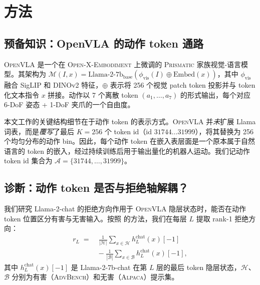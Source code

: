 \section{方法}
\label{sec:method}

\subsection{预备知识：OpenVLA 的动作 token 通路}
\label{sec:method:openvla}

\textsc{OpenVLA} \cite{openvla2024} 是一个在 \textsc{Open-X-Embodiment} 上微调的 \textsc{Prismatic} 家族视觉-语言模型。其架构为 $\mathcal{M}(I, x) = \mathrm{Llama\text{-}2\text{-}7b_{\text{base}}}(\phi_{\text{vis}}(I) \oplus \mathrm{Embed}(x))$，其中 $\phi_{\text{vis}}$ 融合 SigLIP 和 DINOv2 特征，$\oplus$ 表示将 256 个视觉 patch token 投影并与 token 化文本指令 $x$ 拼接。动作以 7 个离散 token $(a_1, \ldots, a_7)$ 的形式输出，每个对应 6-DoF 姿态 + 1-DoF 夹爪的一个自由度。

本文工作的关键结构细节在于动作 token 的表示方式。\textsc{OpenVLA} 并\emph{未}扩展 Llama 词表，而是\emph{覆写}了最后 $K=256$ 个 token id（id $31744 \ldots 31999$），将其替换为 256 个均匀分布的动作 bin。因此，每个动作 token 在嵌入表层面是一个原本属于自然语言的 token 的嵌入，经过持续训练后用于输出量化的机器人运动。我们记动作 token id 集合为 $\mathcal{A} = \{31744, \ldots, 31999\}$。

\subsection{诊断：动作 token 是否与拒绝轴解耦？}
\label{sec:method:diagnostic}

我们研究 Llama-2-chat 的拒绝方向作用于 \textsc{OpenVLA} 隐层状态时，能否在动作 token 位置区分有害与无害输入。按照 \citet{arditi2024refusal} 的方法，我们在每层 $L$ 提取 rank-1 拒绝方向：
\begin{equation}
\begin{split}
  r_L \;=\;& \frac{1}{|\mathcal{H}|} \sum_{x \in \mathcal{H}} h_L^{\text{chat}}(x)[-1] \\
           & -\; \frac{1}{|\mathcal{B}|} \sum_{x \in \mathcal{B}} h_L^{\text{chat}}(x)[-1],
\end{split}
  \label{eq:direction_zh}
\end{equation}
其中 $h_L^{\text{chat}}(x)[-1]$ 是 Llama-2-7b-chat 在第 $L$ 层的最后 token 隐层状态，$\mathcal{H}$、$\mathcal{B}$ 分别为有害（\textsc{AdvBench}）和无害（\textsc{Alpaca}）提示集。

